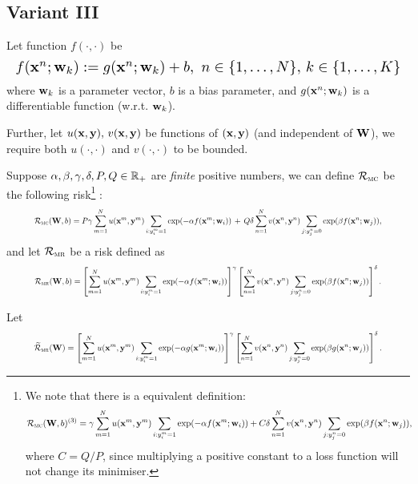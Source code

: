 \subsection{Variant III}

Let function $f(\cdot, \cdot)$ be
\begin{equation*}
\resizebox{\linewidth}{!}{$
f(\x^n; \w_k) := g(\x^n; \w_k) + b, \ n \in \{1,\dots,N\}, \, k \in \{1,\dots,K\}
$}
\end{equation*}
where $\mathbf{w}_k$ is a parameter vector, $b$ is a bias parameter, 
and $g(\mathbf{x}^n; \mathbf{w}_k)$ is a differentiable function (w.r.t. $\mathbf{w}_k$).

Further, let $u(\mathbf{x}, \mathbf{y}), \, v(\mathbf{x}, \mathbf{y})$ be functions of $(\mathbf{x}, \mathbf{y})$ (and independent of $\mathbf{W}$), 
we require both $u(\cdot,\cdot)$ and $v(\cdot,\cdot)$ to be bounded.

Suppose $\alpha, \beta, \gamma, \delta, P, Q \in \mathbb{R}_+$ are \emph{finite} positive numbers, 
we can define $\mathcal{R}_\textsc{mc}$ be the following risk\footnote{
We note that there is a equivalent definition:
\begin{equation*}
\resizebox{\linewidth}{!}{$
\displaystyle
\RCal_\textsc{mc}(\W, b)\pb{3}
= \gamma \sum_{m=1}^N u(\x^m, \y^m) \sum_{i: y_i^m=1} \exp(-\alpha f(\x^m; \w_i)) + 
C \delta \sum_{n=1}^N v(\x^n, \y^n) \sum_{j: y_j^n=0} \exp(\beta  f(\x^n; \w_j)),
$}
\end{equation*}
where $C = Q/P$, since multiplying a positive constant to a loss function will not change its minimiser.}
:
\begin{equation}
\label{eq:mc}
\resizebox{.9\linewidth}{!}{$
\displaystyle
\RCal_\textsc{mc}(\W, b) = P \gamma \sum_{m=1}^N u(\x^m, \y^m) \sum_{i: y_i^m = 1} \exp(-\alpha f(\x^m; \w_i)) \, + \,
                           Q \delta \sum_{n=1}^N v(\x^n, \y^n) \sum_{j: y_j^n = 0} \exp( \beta  f(\x^n; \w_j)),
$}
\end{equation}
and let $\mathcal{R}_\textsc{mr}$ be a risk defined as
\begin{equation}
\label{eq:mr}
\resizebox{.9\linewidth}{!}{$
\displaystyle
\RCal_\textsc{mr}(\W, b) 
= \left[ \sum_{m=1}^N u(\x^m, \y^m) \sum_{i: y_i^m = 1} \exp(-\alpha f(\x^m; \w_i)) \right]^\gamma  
  \left[ \sum_{n=1}^N v(\x^n, \y^n) \sum_{j: y_j^n = 0} \exp( \beta  f(\x^n; \w_j)) \right]^\delta.
$}
\end{equation}

Let 
\begin{equation}
\label{eq:mr}
\resizebox{.9\linewidth}{!}{$
\displaystyle
\widetilde\RCal_\textsc{mr}(\W) 
= \left[ \sum_{m=1}^N u(\x^m, \y^m) \sum_{i: y_i^m = 1} \exp(-\alpha g(\x^m; \w_i)) \right]^\gamma  
  \left[ \sum_{n=1}^N v(\x^n, \y^n) \sum_{j: y_j^n = 0} \exp( \beta  g(\x^n; \w_j)) \right]^\delta.
$}
\end{equation}


